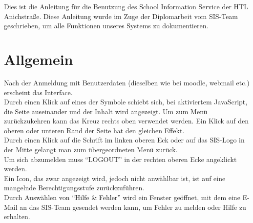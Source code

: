 Dies ist die Anleitung für die Benutzung des School Information Service der HTL Anichstraße. Diese Anleitung wurde im Zuge der Diplomarbeit vom SIS-Team geschrieben, um alle Funktionen unseres Systems zu dokumentieren.

\section{Allgemein}
Nach der Anmeldung mit Benutzerdaten (dieselben wie bei moodle, webmail etc.) erscheint das Interface. \\
Durch einen Klick auf eines der Symbole schiebt sich, bei aktiviertem JavaScript, die Seite auseinander und der Inhalt wird angezeigt. Um zum Menü zurückzukehren kann  das Kreuz rechts oben verwendet werden. Ein Klick auf den oberen oder unteren Rand der Seite hat den gleichen Effekt.\\
Durch einen Klick auf die Schrift im linken oberen Eck oder auf das SIS-Logo in der Mitte gelangt man zum übergeordneten Menü zurück.\\
Um sich abzumelden muss \enquote{LOGOUT} in der rechten oberen Ecke angeklickt werden.\\
Ein Icon, das zwar angezeigt wird, jedoch nicht anwählbar ist, ist auf eine mangelnde Berechtigungsstufe zurückzuführen.\\
Durch Auswählen von \enquote{Hilfe \& Fehler} wird ein Fenster geöffnet, mit dem eine E-Mail an das SIS-Team gesendet werden kann, um Fehler zu melden oder Hilfe zu erhalten.